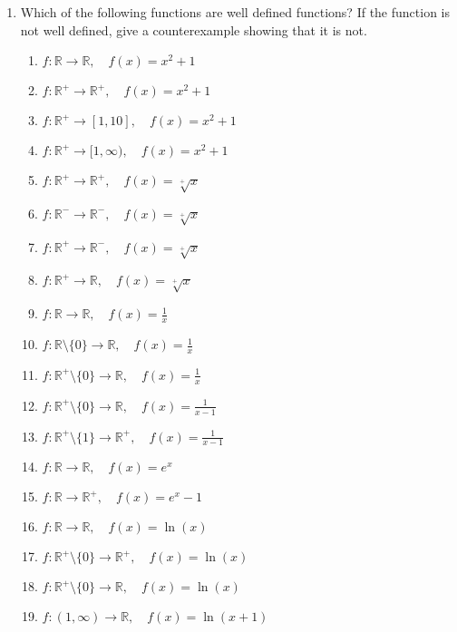 \documentclass[11pt,a4paper,titlepage,oneside,openany]{article}
\numberwithin{equation}{section}
\numberwithin{algorithm}{section}
\numberwithin{figure}{section}
\numberwithin{table}{section}
\newcommand{\mb}{\mathbb}
\begin{document}
\begin{enumerate}
\item Which of the following functions are well defined functions? If the function is not well defined, give a counterexample showing that it is not.
  \begin{multicols}{2}
    \begin{enumerate}
    \item $f: \mb{R} \to \mb{R},\quad f(x)=x^2+1$
    \item $f: \mb{R}^+ \to \mb{R}^+,\quad f(x)=x^2+1$
    \item $f: \mb{R}^+ \to [1,10],\quad f(x)=x^2+1$
    \item $f: \mb{R}^+ \to [1,\infty),\quad f(x)=x^2+1$
    \item $f: \mb{R}^+ \to \mb{R}^+,\quad f(x)=\sqrt[+]{x}$
    \item $f: \mb{R}^- \to \mb{R}^-,\quad f(x)=\sqrt[+]{x}$
    \item $f: \mb{R}^+ \to \mb{R}^-,\quad f(x)=\sqrt[+]{x}$
    \item $f: \mb{R}^+ \to \mb{R},\quad f(x)=\sqrt[+]{x}$
    \item $f: \mb{R} \to \mb{R},\quad f(x)=\frac{1}{x}$
    \item $f: \mb{R}\setminus\{0\} \to \mb{R},\quad f(x)=\frac{1}{x}$
    \item $f: \mb{R}^+\setminus\{0\} \to \mb{R},\quad f(x)=\frac{1}{x}$
    \item $f: \mb{R}^+\setminus\{0\} \to \mb{R},\quad f(x)=\frac{1}{x-1}$
    \item $f: \mb{R}^+\setminus\{1\} \to \mb{R}^+,\quad f(x)=\frac{1}{x-1}$
    \item $f: \mb{R} \to \mb{R},\quad f(x)=e^x$
    \item $f: \mb{R} \to \mb{R}^+,\quad f(x)=e^x-1$
    \item $f: \mb{R} \to \mb{R},\quad f(x)=\ln(x)$
    \item $f: \mb{R}^+\setminus \{0\} \to \mb{R}^+,\quad f(x)=\ln(x)$
    \item $f: \mb{R}^+\setminus \{0\} \to \mb{R},\quad f(x)=\ln(x)$
    \item $f: (1,\infty) \to \mb{R},\quad f(x)=\ln(x+1)$
    \end{enumerate}
  \end{multicols}


\end{enumerate}
\end{document}
